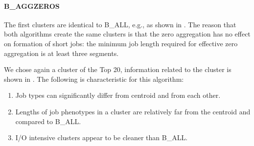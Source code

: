 \documentclass{jhps}
\begin{document}
\FloatBarrier
\paragraph{B\_AGGZEROS}
The first clusters are identical to B\_ALL, e.g., as shown in .
The reason that both algorithms create the same clusters is that the zero aggregation has no effect on formation of short jobs: the minimum job length required for effective zero aggregation is at least three segments.

We chose again a cluster of the Top 20, information related to the cluster is shown in .
The following is characteristic for this algorithm:

\begin{enumerate}
 \item Job types can significantly differ from centroid and from each other.
 \item Lengths of job phenotypes in a cluster are relatively far from the centroid and compared to B\_ALL.
 \item I/O intensive clusters appear to be cleaner than B\_ALL.
\end{enumerate}
\end{document}
